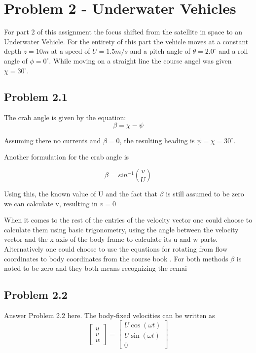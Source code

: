 \section*{Problem 2 - Underwater Vehicles}
For part 2 of this assignment the focus shifted from the satellite in space to an Underwater Vehicle. For the entirety of this part the vehicle moves at a constant depth $z=10m$ at a speed of $U=1.5m/s$ and a pitch angle of $\theta = 2.0^\circ$ and a roll angle of $\phi = 0^\circ$. While moving on a straight line the course angel was given $\chi = 30^\circ$.
\subsection*{Problem 2.1}
The crab angle is given by the equation:
\begin{equation}
    \beta = \chi - \psi
\end{equation}

Assuming there no currents and $\beta = 0$, the resulting heading is $\psi = \chi = 30^\circ$.

Another formulation for the crab angle is

\begin{equation}
    \beta = sin^{-1}(\frac{v}{U})
\end{equation}

Using this, the known value of U and the fact that $\beta$ is still assumed to be zero we can calculate v, resulting in $v=0$

When it comes to the rest of the entries of the velocity vector one could choose to calculate them using basic trigonometry, using the angle between the velocity vector and the x-axis of the body frame to calculate its u and w parts. Alternatively one could choose to use the equations for rotating from flow coordinates to body coordinates from the course book \cite{Fossen2011}. For both methods $\beta$ is noted to be zero and they both means recognizing the remai

\subsection*{Problem 2.2}
Answer Problem 2.2 here. The body-fixed velocities can be written as
\begin{equation}
\label{eq:velocity}
	\begin{bmatrix}
		u \\
		v \\
		w
	\end{bmatrix}
	= 
	\begin{bmatrix}
		U \cos( \omega t)\\
		U \sin(\omega t)\\
		0	
	\end{bmatrix}
\end{equation}

